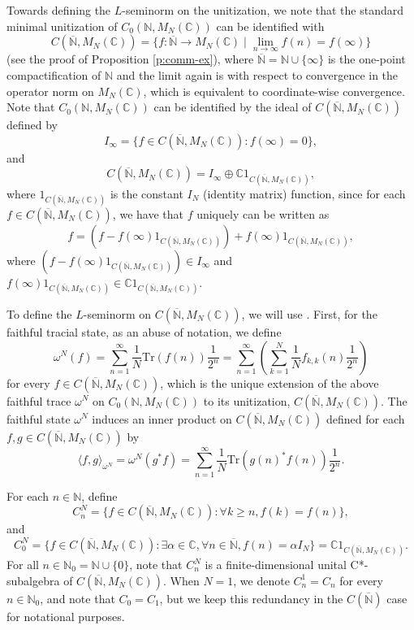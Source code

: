 \documentclass{amsart}
\theoremstyle{plain}
\theoremstyle{definition}
\theoremstyle{remark}
\numberwithin{equation}{section}
\newcommand{\al}{{\alpha}}
\newcommand{\N}{{\mathds{N}}}
\newcommand{\C}{{\mathds{C}}}
\renewcommand{\geq}{\geqslant}
\begin{document}
Towards defining the $L$-seminorm on the unitization, we note that the standard minimal unitization of $C_0(\N, M_N(\C))$ can be identified with 
\[
C(\overline{\N}, M_N(\C))=\{f:\overline{\N}\rightarrow M_N(\C) \mid \lim_{n\to \infty}f(n)=f(\infty)\}
\]
(see the proof of Proposition  \ref{p:comm-ex}), 
where $\overline{\N}=\N\cup \{\infty\}$ is the one-point compactification of $\N$ and the limit again is with respect to convergence in the operator norm on $M_N(\C)$, which is equivalent to coordinate-wise convergence. Note that  $C_0(\N, M_N(\C))$ can be identified by the ideal of $C(\overline{\N}, M_N(\C))$ defined by 
\[
I_\infty=\{f\in C(\overline{\N}, M_N(\C)) : f(\infty)=0\},
\]
and 
\[
C(\overline{\N}, M_N(\C))=I_\infty \oplus \C1_{C(\overline{\N}, M_N(\C))},
\]
where $1_{C(\overline{\N}, M_N(\C))}$ is the constant $I_N$ (identity matrix) function, since for each $f\in C(\overline{\N}, M_N(\C))$, we have that $f$ uniquely can be written as \[f=(f-f(\infty)1_{C(\overline{\N}, M_N(\C))})+f(\infty)1_{C(\overline{\N}, M_N(\C))},\] where $(f-f(\infty)1_{C(\overline{\N}, M_N(\C))})\in I_\infty$ and $f(\infty)1_{C(\overline{\N}, M_N(\C))}\in \C1_{C(\overline{\N}, M_N(\C))}$. 

To define the $L$-seminorm on $C(\overline{\N}, M_N(\C))$,  we will use \cite[Theorem 3.5]{Aguilar-Latremoliere15}.    First, for the faithful tracial state, as an abuse of notation, we define
\[
\omega^N(f)=\sum_{n=1}^\infty \frac{1}{N}\mathrm{Tr}(f(n))\frac{1}{2^n}=\sum_{n=1}^\infty \left(\sum_{k=1}^N\frac{1}{N}f_{k,k}(n)\frac{1}{2^n}\right)
\]
for every $f\in C(\overline{\N}, M_N(\C))$, which is the unique extension of the above faithful trace $\omega^N$ on $C_0(\N, M_N(\C))$ to its unitization, $C(\overline{\N}, M_N(\C))$. The faithful state $\omega^N$ induces an inner product on $C(\overline{\N}, M_N(\C))$ defined for each $f,g\in C(\overline{\N}, M_N(\C))$ by
\[
\langle f,g\rangle_{\omega^N} =\omega^N(g^*f)=\sum_{n=1}^\infty \frac{1}{N}\mathrm{Tr}(g(n)^*f(n))\frac{1}{2^n}.
\]
 
For each $n\in \N$, define
\[
C_n^N=\{f\in C(\overline{\N}, M_N(\C)) : \forall k \geq n, f(k)=f(n)\},
\]
and  
\[
C_0^N=\{f\in C(\overline{\N}, M_N(\C)) : \exists \al\in \C, \forall  n\in \overline{\N}, f(n)=\al I_N\}=\C1_{C(\overline{\N}, M_N(\C))}.
\]
For all $n\in \N_0=\N\cup \{0\}$, note that $C_n^N$ is a finite-dimensional unital C*-subalgebra  of $C(\overline{\N}, M_N(\C))$. When $N=1$, we denote $C^1_n=C_n$ for every $n\in \N_0$, and note that $C_0=C_1$, but we keep this redundancy  in the $C(\overline{\N})$ case for notational purposes. 
 
\end{document}
